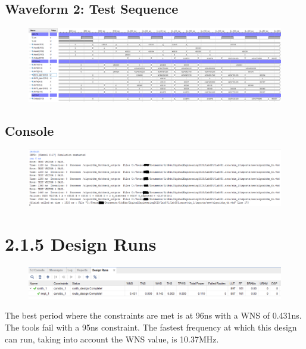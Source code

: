 \documentclass[11pt]{report}
\begin{document}
\subsection*{Waveform 2: Test Sequence}
\begin{figure}[H]
    \includegraphics[width=\columnwidth]{Assets/2.1.4_waveform-test-sequence.png}
\end{figure}

\subsection*{Console}
\begin{figure}[H]
    \includegraphics[width=\columnwidth]{Assets/2.1.4_console.png}
\end{figure}

\section*{2.1.5 Design Runs}
\begin{figure}[H]
    \includegraphics[width=\columnwidth]{Assets/2.1.5_design-runs.png}
\end{figure}
The best period where the constraints are met is at 96ns with a WNS of 0.431ns. The tools fail with a 95ns constraint. The fastest frequency at which this design can run, taking into account the WNS value, is 10.37MHz.
\end{document}
